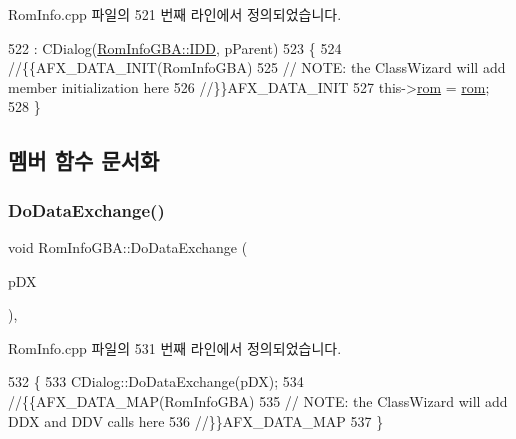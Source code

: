 Rom\+Info.\+cpp 파일의 521 번째 라인에서 정의되었습니다.


\begin{DoxyCode}
522   : CDialog(\mbox{\hyperlink{class_rom_info_g_b_a_a6425fe061557249d4e064c130d9768f8a10060dd49f055afb737390d2a0f0c93c}{RomInfoGBA::IDD}}, pParent)
523 \{
524   \textcolor{comment}{//\{\{AFX\_DATA\_INIT(RomInfoGBA)}
525   \textcolor{comment}{// NOTE: the ClassWizard will add member initialization here}
526   \textcolor{comment}{//\}\}AFX\_DATA\_INIT}
527   this->\mbox{\hyperlink{class_rom_info_g_b_a_af44895da29e3b91d95cd31f3acb0eb60}{rom}} = \mbox{\hyperlink{class_rom_info_g_b_a_af44895da29e3b91d95cd31f3acb0eb60}{rom}};
528 \}
\end{DoxyCode}


\subsection{멤버 함수 문서화}
\mbox{\label{class_rom_info_g_b_a_a19a2f111cce09e494d2877767ad615dd}} 
\subsubsection{\texorpdfstring{Do\+Data\+Exchange()}{DoDataExchange()}}
{\footnotesize\ttfamily void Rom\+Info\+G\+B\+A\+::\+Do\+Data\+Exchange (\begin{DoxyParamCaption}\item[{C\+Data\+Exchange $\ast$}]{p\+DX }\end{DoxyParamCaption})\hspace{0.3cm}{\ttfamily [protected]}, {\ttfamily [virtual]}}



Rom\+Info.\+cpp 파일의 531 번째 라인에서 정의되었습니다.


\begin{DoxyCode}
532 \{
533   CDialog::DoDataExchange(pDX);
534   \textcolor{comment}{//\{\{AFX\_DATA\_MAP(RomInfoGBA)}
535   \textcolor{comment}{// NOTE: the ClassWizard will add DDX and DDV calls here}
536   \textcolor{comment}{//\}\}AFX\_DATA\_MAP}
537 \}
\end{DoxyCode}
\mbox{\label{class_rom_info_g_b_a_aa449f0a97d7515dd30ef8b5dabb343a3}} 
